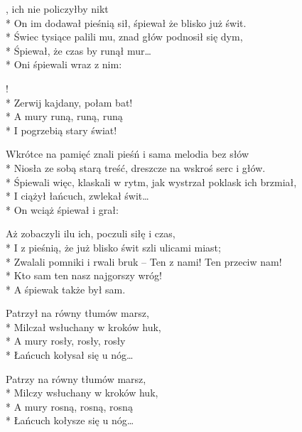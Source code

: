 
\begin{lyrics}[longestline={Śpiewali więc, klaskali w rytm, jak wystrzał poklask ich brzmiał,}]

, ich nie policzyłby nikt\\*
On im dodawał pieśnią sił, śpiewał że blisko już świt.\\*
Świec tysiące palili mu, znad głów podnosił się dym,\\*
Śpiewał, że czas by runął mur\ldots\\*
Oni śpiewali wraz z nim:

\begin{chorus}
!\\*
Zerwij kajdany, połam bat!\\*
A mury runą, runą, runą\\*
I pogrzebią stary świat!
\end{chorus}

Wkrótce na pamięć znali pieśń i sama melodia bez słów\\*
Niosła ze sobą starą treść, dreszcze na wskroś serc i głów.\\*
Śpiewali więc, klaskali w rytm, jak wystrzał poklask ich brzmiał,\\*
I ciążył łańcuch, zwlekał świt\ldots\\*
On wciąż śpiewał i grał:

\chorusref

Aż zobaczyli ilu ich, poczuli siłę i czas,\\*
I z pieśnią, że już blisko świt szli ulicami miast;\\*
Zwalali pomniki i rwali bruk -- Ten z nami! Ten przeciw nam!\\*
Kto sam ten nasz najgorszy wróg!\\*
A śpiewak także był sam.

Patrzył na równy tłumów marsz,\\*
Milczał wsłuchany w kroków huk,\\*
A mury rosły, rosły, rosły\\*
Łańcuch kołysał się u nóg\ldots

Patrzy na równy tłumów marsz,\\*
Milczy wsłuchany w kroków huk,\\*
A mury rosną, rosną, rosną\\*
Łańcuch kołysze się u nóg\ldots
\end{lyrics}



